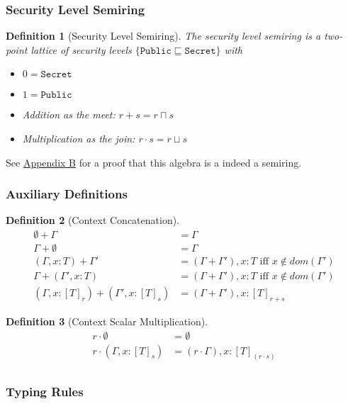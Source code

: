 \documentclass[conference]{IEEEtran}
\newcommand\public{\texttt{Public}}
\newcommand\secret{\texttt{Secret}}
\newtheorem{definition}{Definition}
\begin{document}
\subsubsection{Security Level Semiring}

\begin{definition}[Security Level Semiring]
The security level semiring is a two-point lattice of security levels $\{\public\sqsubseteq\secret\}$ with 
\begin{itemize}
	\item $0=\secret$
	\item $1=\public$
	\item Addition as the meet: $r+s=r\sqcap s$
	\item Multiplication as the join: $r\cdot s=r\sqcup s$
\end{itemize}
\end{definition}
See \hyperref[app-b]{Appendix B} for a proof that this algebra is a indeed a semiring.

\subsubsection{Auxiliary Definitions}
\begin{definition}[Context Concatenation]
    $$
    \begin{aligned}
        \emptyset+\Gamma&=\Gamma\\
        \Gamma+\emptyset&=\Gamma\\
        (\Gamma,x:T)+\Gamma'&=(\Gamma+\Gamma'),x:T\text{ iff }x\notin dom(\Gamma')\\
        \Gamma+(\Gamma',x:T)&=(\Gamma+\Gamma'),x:T\text{ iff }x\notin dom(\Gamma')\\
        (\Gamma,x:[T]_r)+(\Gamma',x:[T]_s)&=(\Gamma+\Gamma'),x:[T]_{r+s}
    \end{aligned}
    $$
\end{definition}

\begin{definition}[Context Scalar Multiplication]
    $$
    \begin{aligned}
    r\cdot\emptyset&=\emptyset\\
    r\cdot(\Gamma,x:[T]_s)&=(r\cdot\Gamma),x:[T]_{(r\cdot s)}\\
    \end{aligned}
    $$
\end{definition}

\subsubsection{Typing Rules}
\end{document}
